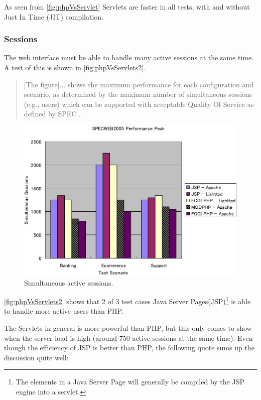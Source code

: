 As seen from \autoref{fig:phpVsServlet} Servlets are faster in all tests, with and without Just In Time (JIT) compilation.

\subsubsection*{Sessions}
The web interface must be able to handle many active sessions at the same time. A test of this is shown in \autoref{fig:phpVsServlets2}\cite[p. 173]{servletVsPHP}.

\begin{quotation}
[The figure]... shows the maximum performance for each configuration and scenario, as
determined by the maximum number of simultaneous sessions (e.g., users) which can
be supported with acceptable Quality Of Service as defined by SPEC \cite[p. 173]{servletVsPHP}.
\end{quotation}

\begin{figure}[htbp]
	\centering
		\includegraphics[width=1.00\textwidth]{images/phpVsServlets2.png}
	\caption{Simultaneous active sessions.}
	\label{fig:phpVsServlets2}
\end{figure}

\autoref{fig:phpVsServlets2} shows that 2 of 3 test cases Java Server Pages(JSP)\footnote{The elements in a Java Server Page will generally be compiled by the JSP engine into a servlet\cite{devx}.} is able to handle more active users than PHP.

The Servlets in general is more powerful than PHP, but this only comes to show when the server load is high (around 750 active sessions at the same time). Even though the efficiency of JSP is better than PHP, the following quote sums up the discussion quite well:

